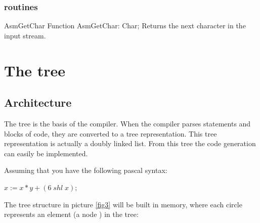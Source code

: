 \documentclass [a4paper,12pt]{article}
\begin{document}
\subsubsection{routines}

\begin{function}{AsmGetChar}
\Declaration
Function AsmGetChar: Char;
\Description
Returns the next character in the input stream. 
\end{function}


\section{The tree}
\label{sec:mylabel2}

\subsection{Architecture}
\label{subsec:architecturenext}

The tree is the basis of the compiler. When the compiler parses statements
and blocks of code, they are converted to a tree representation. This tree
representation is actually a doubly linked list. From this tree the code
generation can easily be implemented.

Assuming that you have the following pascal syntax:


\begin{center}
$ x := x * y + (6\; shl \; x);$
\end{center}

The tree structure in picture \ref{fig3} will be built in memory, where each
circle represents an element (a node ) in the tree:
\end{document}
